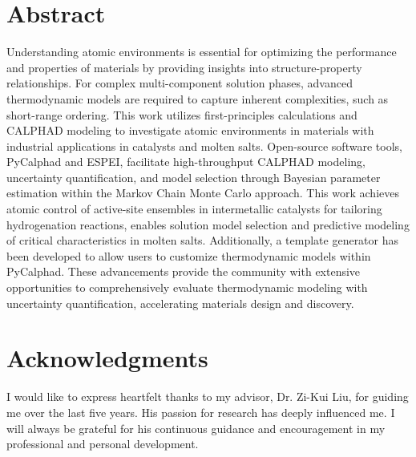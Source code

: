 \documentclass[letterpaper, 12pt]{report}
\begin{document}
\vfill


\newpage
\chapter*{Abstract}
Understanding atomic environments is essential for optimizing the performance and properties of materials by providing insights into structure-property relationships. For complex multi-component solution phases, advanced thermodynamic models are required to capture inherent complexities, such as short-range ordering. This work utilizes first-principles calculations and CALPHAD modeling to investigate atomic environments in materials with industrial applications in catalysts and molten salts. Open-source software tools, PyCalphad and ESPEI, facilitate high-throughput CALPHAD modeling, uncertainty quantification, and model selection through Bayesian parameter estimation within the Markov Chain Monte Carlo approach. This work achieves atomic control of active-site ensembles in intermetallic catalysts for tailoring hydrogenation reactions, enables solution model selection and predictive modeling of critical characteristics in molten salts. Additionally, a template generator has been developed to allow users to customize thermodynamic models within PyCalphad. These advancements provide the community with extensive opportunities to comprehensively evaluate thermodynamic modeling with uncertainty quantification, accelerating materials design and discovery.

\newpage
\setcounter{tocdepth}{3}
\tableofcontents

\newpage
{}
\renewcommand{\listfigurename}{List of Figures}
\listoffigures

\newpage
{}
\renewcommand{\listtablename}{List of Tables}
\listoftables

\newpage
\chapter*{Acknowledgments}
\label{acknowledgments}

I would like to express heartfelt thanks to my advisor, Dr. Zi-Kui Liu, for guiding me over the last five years. His passion for research has deeply influenced me. I will always be grateful for his continuous guidance and encouragement in my professional and personal development.
\end{document}
